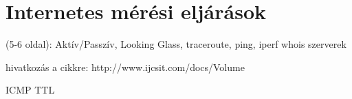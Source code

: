
\section{Internetes mérési eljárások}
(5-6 oldal): Aktív/Passzív, Looking Glass, traceroute, ping, iperf
 whois szerverek
 
 
hivatkozás a cikkre: http://www.ijcsit.com/docs/Volume%

ICMP TTL

